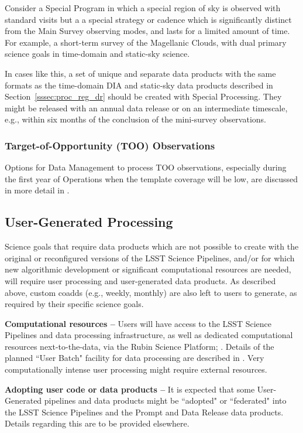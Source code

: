 Consider a Special Program in which a special region of sky is observed with standard
visits but a a special strategy or cadence which is significantly distinct from the Main Survey
observing modes, and lasts for a limited amount of time.
For example, a short-term survey of the Magellanic Clouds, with dual primary science
goals in time-domain and static-sky science.

In cases like this, a set of unique and separate data products with the same formats as the 
time-domain DIA and static-sky data products described in Section~\ref{sssec:proc_reg_dr}
should be created with Special Processing.
They might be released with an annual data release or on an intermediate timescale, e.g.,
within six months of the conclusion of the mini-survey observations.

\subsubsection{Target-of-Opportunity (TOO) Observations}

Options for Data Management to process TOO observations, especially during the first year of Operations 
when the template coverage will be low, are discussed in more detail in 
.

\subsection{User-Generated Processing}\label{ssec:proc_user}

Science goals that require data products which are not possible to create with 
the original or reconfigured versions of the LSST Science Pipelines, 
and/or for which new algorithmic development or significant computational resources 
are needed, will require user processing and user-generated data products.
As described above, custom coadds (e.g., weekly, monthly) are also left to users 
to generate, as required by their specific science goals.

\textbf{Computational resources -- }
Users will have access to the LSST Science Pipelines and data processing 
infrastructure, as well as dedicated computational resources next-to-the-data, 
via the Rubin Science Platform; .
Details of the planned ``User Batch" facility for data processing are described in 
.
Very computationally intense user processing might require external resources. 

\textbf{Adopting user code or data products --}
It is expected that some User-Generated pipelines and data products 
might be ``adopted" or ``federated" into the LSST Science Pipelines and the Prompt 
and Data Release data products.
Details regarding this are to be provided elsewhere.

